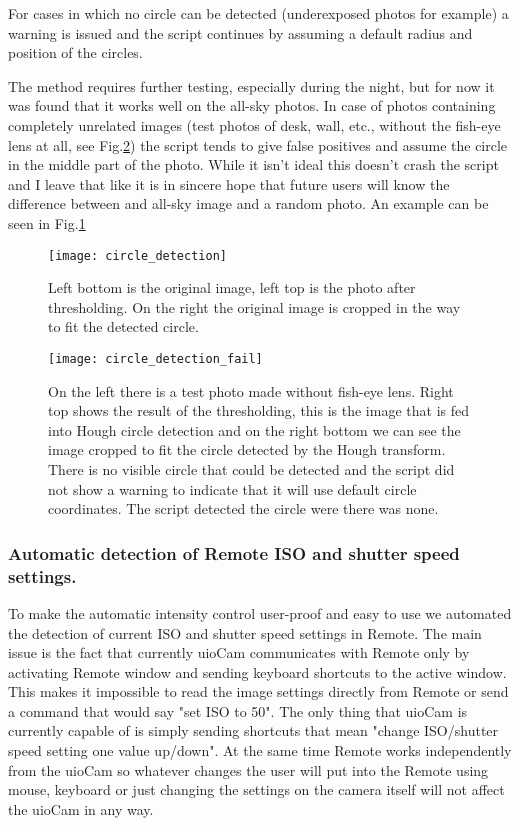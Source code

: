 \documentclass[]{book}
\begin{document}
		For cases in which no circle can be detected (underexposed photos for example) a warning is issued and the script continues by assuming a default radius and position of the circles.
		
		The method requires further testing, especially during the night, but for now it was found that it works well on the all-sky photos. In case of photos containing completely unrelated images (test photos of desk, wall, etc., without the fish-eye lens at all, see Fig.\ref{fig: circle_detection_fail}) the script tends to give false positives and assume the circle in the middle part of the photo. While it isn't ideal this doesn't crash the script and I leave that like it is in sincere hope that future users will know the difference between and all-sky image and a random photo. An example can be seen in Fig.\ref{fig: circle_detection}
		
		\begin{figure}
			\centering
			\texttt{[image: circle\_detection]}
			\label{fig: circle_detection}
			\caption{Left bottom is the original image, left top is the photo after thresholding. On the right the original image is cropped in the way to fit the detected circle.}
		\end{figure}
	
		\begin{figure}
			\centering
			\texttt{[image: circle\_detection\_fail]}
			\label{fig: circle_detection_fail}
			\caption{On the left there is a test photo made without fish-eye lens. Right top shows the result of the thresholding, this is the image that is fed into Hough circle detection and on the right bottom we can see the image cropped to fit the circle detected by the Hough transform. There is no visible circle that could be detected and the script did not show a warning to indicate that it will use default circle coordinates. The script detected the circle were there was none.}
		\end{figure}
	
		\subsubsection{Automatic detection of Remote ISO and shutter speed settings.}
		
		To make the automatic intensity control user-proof and easy to use we automated the detection of current ISO and shutter speed settings in Remote. The main issue is the fact that currently uioCam communicates with Remote only by activating Remote window and sending keyboard shortcuts to the active window. This makes it impossible to read the image settings directly from Remote or send a command that would say "set ISO to 50". The only thing that uioCam is currently capable of is simply sending shortcuts that mean "change ISO/shutter speed setting one value up/down". At the same time Remote works independently from the uioCam so whatever changes the user will put into the Remote using mouse, keyboard or just changing the settings on the camera itself will not affect the uioCam in any way.
		
\end{document}
